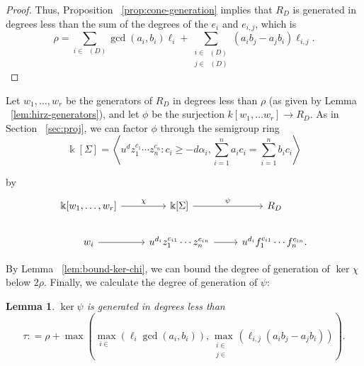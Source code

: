 \documentclass{amsart}
\theoremstyle{plain}
\newtheorem{lem}[thm]{Lemma}
\theoremstyle{definition}
\theoremstyle{remark}
\numberwithin{equation}{section}
\newcommand\bk{{\Bbbk}}
\newcommand\bida{a}
\newcommand\bidb{b}
\DeclareMathOperator{\Te}{T_=}
\DeclareMathOperator{\Tp}{T_+}
\DeclareMathOperator{\Tm}{T_-}
\begin{document}
\begin{proof}
Thus, Proposition ~\ref{prop:cone-generation} implies that 
$R_D$ is generated in 
degrees less than the sum of the degrees of the $e_i$ and $e_{i,j}$, which is
\[
	\rho = \sum_{i\in \Te(D)} \gcd(\bida_i, \bidb_i)\ell_i + \sum_{\substack{
	i \in \Tp(D) \\	j \in \Tm(D)}} (\bida_i \bidb_j- \bida_j \bidb_i)\ell_{i,j}.
\]
\end{proof}

Let $w_1, \ldots, w_r$ be the generators of $R_D$ in degrees less than $\rho$
(as given by Lemma ~\ref{lem:hirz-generators}), and let $\phi$ be the
surjection $k[w_1, \ldots w_r] \to R_D$. As in Section ~\ref{sec:proj}, we can factor $\phi$ through the
semigroup ring 
\[
	\bk[\Sigma] = \left \langle u^d z_1^{c_1} \cdots z_n^{c_n} \colon c_i \geq -d
	\alpha_i, \sum_{i=1}^{n} \bida_i c_i = \sum_{i=1}^{n} \bidb_i c_i
	\right \rangle
\]

\noindent
by
\[
\begin{tikzcd}
	\bk[w_1,\ldots, w_r] \ar {r}{\chi} & \bk[\Sigma] \ar {r}{\psi} & R_D \\
	w_i \ar r & u^{d_i}z_1^{c_{i1}} \cdots z_n^{c_{in}} \ar r & u^{d_i}f_1^{c_{i1}} \cdots f_n^{c_{in}}.
\end{tikzcd}
\]

By Lemma ~\ref{lem:bound-ker-chi}, we can bound the degree of generation of $\ker \chi$ below
$2 \rho$.
Finally, we calculate the degree of generation of $\psi$:

\begin{lem}
\label{lem:hirz-bound-ker-psi}
$\ker \psi$ is generated in degrees less than
\[
	\tau \colon = \rho
	+ \max \left(\max_{i\in \Te}(\ell_i \gcd(a_i, b_i)), \max_{\substack{
	i \in	\Tp \\ j\in \Tm}} (\ell_{i,j} (\bida_i \bidb_j - \bida_j \bidb_i))
	\right).
\]
\end{lem}
\end{document}
